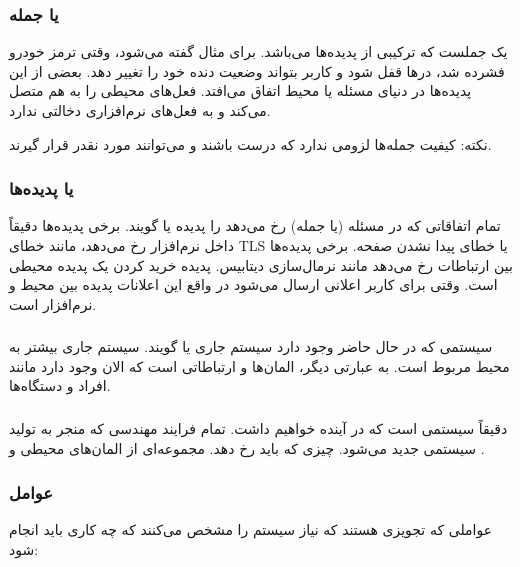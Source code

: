 \subsubsection{ یا جمله}

 یک جملست که ترکیبی از پدیده‌ها می‌باشد. برای مثال گفته می‌شود،
وقتی ترمز خودرو فشرده شد، در‌ها قفل شود و کاربر بتواند وضعیت دنده خود را تغییر
دهد. بعضی از این پدیده‌ها در دنیای مسئله یا محیط اتفاق می‌افتد. فعل‌های محیطی را
به هم متصل می‌کند و به فعل‌های نرم‌افزاری دخالتی ندارد.

نکته: کیفیت جمله‌ها لزومی ندارد که درست باشند و می‌توانند مورد نقدر قرار گیرند.

\subsubsection{ یا پدیده‌ها}

تمام اتفاقاتی که در مسئله (یا جمله) رخ می‌دهد را پدیده یا  گویند.
برخی پدیده‌ها دقیقاً داخل نرم‌افزار رخ می‌دهد، مانند خطای TLS یا خطای پیدا نشدن
صفحه. برخی پدیده‌ها بین ارتباطات رخ می‌دهد مانند نرمال‌سازی دیتابیس. پدیده خرید
کردن یک پدیده محیطی است. وقتی برای کاربر اعلانی ارسال می‌شود در واقع این اعلانات
پدیده‌ بین محیط و نرم‌افزار است.

\subsubsection{}

سیستمی که در حال حاضر وجود دارد سیستم جاری یا  گویند. سیستم
جاری بیشتر به محیط مربوط است. به عبارتی دیگر، المان‌ها و ارتباطاتی است که الان
وجود دارد مانند افراد و دستگاه‌ها.

\subsubsection{}

 دقیقاً سیستمی است که در آینده خواهیم داشت. تمام فرایند مهندسی
که منجر به تولید سیستمی جدید می‌شود. چیزی که باید رخ دهد. مجموعه‌ای از المان‌های
محیطی و .

\subsubsection{عوامل }

عواملی که تجویزی هستند که نیاز سیستم را مشخص می‌کنند که چه کاری باید انجام شود:

